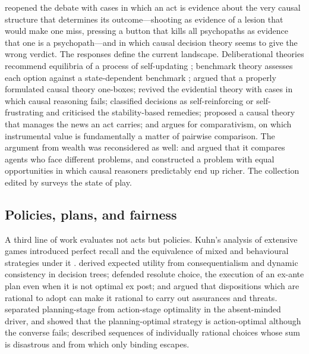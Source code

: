 \textcite{egan2007} reopened the debate with cases in which an act is evidence about the very causal
structure that determines its outcome---shooting as evidence of a lesion that would make one miss,
pressing a button that kills all psychopaths as evidence that one is a psychopath---and in which
causal decision theory seems to give the wrong verdict. The responses define the current landscape.
Deliberational theories recommend equilibria of a process of self-updating
\autocite{arntzenius2008,joyce2012,joyce2018}; benchmark theory assesses each option against a
state-dependent benchmark \autocite{wedgwood2013}; \textcite{spohn2012} argued that a properly
formulated causal theory one-boxes; \textcite{ahmed2012,ahmed2014book,ahmed2014dicing} revived the
evidential theory with cases in which causal reasoning fails; \textcite{harehedden2016} classified
decisions as self-reinforcing or self-frustrating and criticised the stability-based remedies;
\textcite{gallow2020} proposed a causal theory that manages the news an act carries; and
\textcite{gallow2026} argues for comparativism, on which instrumental value is fundamentally a matter
of pairwise comparison. The argument from wealth was reconsidered as well: \textcite{bales2018} and
\textcite{spencerwells2019} argued that it compares agents who face different problems, and
\textcite{wells2019} constructed a problem with equal opportunities in which causal reasoners
predictably end up richer. The collection edited by \textcite{ahmed2018ed} surveys the state of play.

\subsection{Policies, plans, and fairness}

A third line of work evaluates not acts but policies. Kuhn's analysis of extensive games introduced
perfect recall and the equivalence of mixed and behavioural strategies under it
\autocite{kuhn1953}. \textcite{hammond1988} derived expected utility from consequentialism and dynamic
consistency in decision trees; \textcite{mcclennen1990} defended resolute choice, the execution of an
ex-ante plan even when it is not optimal ex post; and \textcite{gauthier1986,gauthier1994} argued that
dispositions which are rational to adopt can make it rational to carry out assurances and threats.
\textcite{piccionerubinstein1997} separated planning-stage from action-stage optimality in the
absent-minded driver, and \textcite{aumannetal1997} showed that the planning-optimal strategy is
action-optimal although the converse fails; \textcite{arntzeniusetal2004} described sequences of
individually rational choices whose sum is disastrous and from which only binding escapes.

